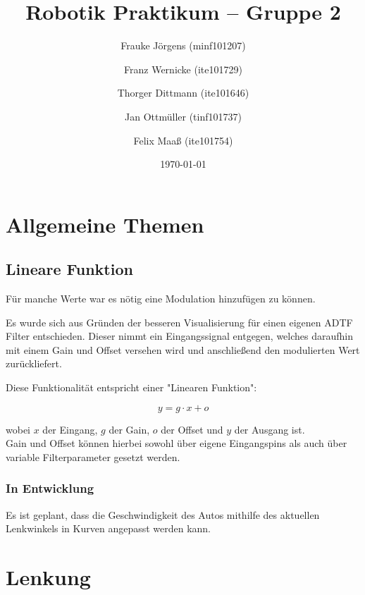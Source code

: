 \documentclass[a4paper,12pt]{report}
\begin{document}
	

	\title{Robotik Praktikum -- Gruppe 2}
	\author{Frauke Jörgens (minf101207) \and Franz Wernicke (ite101729) \and Thorger Dittmann (ite101646) \and Jan Ottmüller (tinf101737) \and Felix Maaß (ite101754)}
	\date{\today}
	\maketitle
	
	\tableofcontents
	

\chapter{Allgemeine Themen}
\section{Lineare Funktion}

	Für manche Werte war es nötig eine Modulation hinzufügen zu können.
	
	Es wurde sich aus Gründen der besseren Visualisierung für einen eigenen ADTF Filter entschieden.
	Dieser nimmt ein Eingangssignal entgegen, welches daraufhin mit einem Gain und Offset versehen wird und anschließend den modulierten Wert zurückliefert.
	
	Diese Funktionalität entspricht einer "Linearen Funktion":
	
	\[y = g \cdot x + o\]
	
	wobei $x$ der Eingang, $g$ der Gain, $o$ der Offset und $y$ der Ausgang ist.
	\\
	Gain und Offset können hierbei sowohl über eigene Eingangspins als auch über variable Filterparameter gesetzt werden.

\subsection{In Entwicklung}

	Es ist geplant, dass die Geschwindigkeit des Autos mithilfe des aktuellen Lenkwinkels in Kurven angepasst werden kann.

\chapter{Lenkung}

\end{document}
